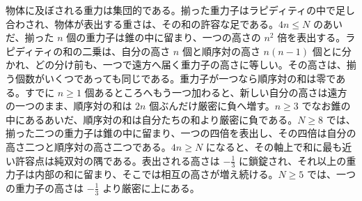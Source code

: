 \documentclass[a4paper]{article}
\begin{document}
物体に及ぼされる重力は集団的である。揃った重力子はラピディティの中で足し合わされ、物体が表出する重さは、その和の許容な足である。\(4n\le N\) のあいだ、揃った \(n\) 個の重力子は錐の中に留まり、一つの高さの \(n^2\) 倍を表出する。ラピディティの和の二乗は、自分の高さ \(n\) 個と順序対の高さ \(n(n-1)\) 個とに分かれ、どの分け前も、一つで遠方へ届く重力子の高さに等しい。その高さは、揃う個数がいくつであっても同じである。重力子が一つなら順序対の和は零である。すでに \(n\ge 1\) 個あるところへもう一つ加わると、新しい自分の高さは遠方の一つのまま、順序対の和は \(2n\) 個ぶんだけ厳密に負へ増す。\(n\ge 3\) でなお錐の中にあるあいだ、順序対の和は自分たちの和より厳密に負である。\(N\ge 8\) では、揃った二つの重力子は錐の中に留まり、一つの四倍を表出し、その四倍は自分の高さ二つと順序対の高さ二つである。\(4n\ge N\) になると、その軸上で和に最も近い許容点は純双対の隅である。表出される高さは \(-\frac13\) に鎖錠され、それ以上の重力子は内部の和に留まり、そこでは相互の高さが増え続ける。\(N\ge 5\) では、一つの重力子の高さは \(-\frac13\) より厳密に上にある。
\end{document}
